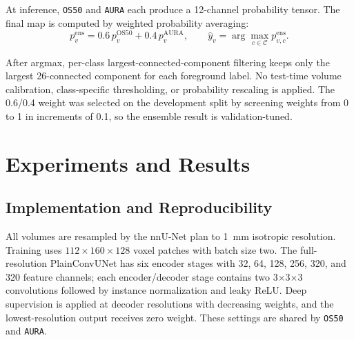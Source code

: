 \documentclass[runningheads]{llncs}
\newcommand{\osfifty}{\texttt{OS50}}
\newcommand{\aura}{\texttt{AURA}}
\begin{document}
At inference, \osfifty{} and \aura{} each produce a 12-channel probability tensor. The final map is computed by weighted probability averaging:
\begin{equation}
p^{\mathrm{ens}}_v =
0.6\,p^{\mathrm{OS50}}_v
+
0.4\,p^{\mathrm{AURA}}_v,
\qquad
\hat{y}_v =
\arg\max_{c\in\mathcal{C}} p^{\mathrm{ens}}_{v,c}.
\label{eq:ensemble}
\end{equation}

After argmax, per-class largest-connected-component filtering keeps only the largest 26-connected component for each foreground label. No test-time volume calibration, class-specific thresholding, or probability rescaling is applied. The 0.6/0.4 weight was selected on the development split by screening weights from 0 to 1 in increments of 0.1, so the ensemble result is validation-tuned.






\section{Experiments and Results}


\subsection{Implementation and Reproducibility}

All volumes are resampled by the nnU-Net plan to 1~mm isotropic resolution. Training uses $112\times160\times128$ voxel patches with batch size two. The full-resolution PlainConvUNet has six encoder stages with 32, 64, 128, 256, 320, and 320 feature channels; each encoder/decoder stage contains two 3$\times$3$\times$3 convolutions followed by instance normalization and leaky ReLU. Deep supervision is applied at decoder resolutions with decreasing weights, and the lowest-resolution output receives zero weight. These settings are shared by \osfifty{} and \aura{}.

\end{document}

